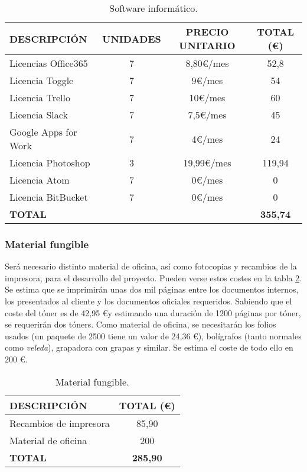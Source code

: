 \begin{table}[H]
\begin{center}
\begin{tabular}{l c c c}
\textbf{DESCRIPCIÓN} & \textbf{UNIDADES} & \textbf{PRECIO UNITARIO} & \textbf{TOTAL (\euro)}\\ \hline \hline
Licencias Office365 & 7 & 8,80\euro/mes & 52,8\\
Licencia Toggle & 7 & 9\euro/mes & 54\\
Licencia Trello & 7 & 10\euro/mes & 60\\
Licencia Slack & 7 & 7,5\euro/mes & 45\\
Google Apps for Work & 7 & 4\euro/mes & 24\\
Licencia Photoshop & 3 & 19,99\euro/mes & 119,94\\
Licencia Atom & 7 & 0\euro/mes & 0\\
Licencia BitBucket & 7 & 0\euro/mes & 0\\ \hline \hline
\textbf{TOTAL} & & & \textbf{355,74}\\ \hline
\end{tabular}
\caption{Software informático.}
\label{tab:software}
\end{center}
\end{table}



\subsubsection{Material fungible}
\par Será necesario distinto material de oficina, así como fotocopias y recambios de la impresora, para el desarrollo del proyecto. Pueden verse estos costes en la tabla \ref{tab:fungible}. Se estima que se imprimirán unas dos mil páginas entre los documentos internos, los presentados al cliente y los documentos oficiales requeridos. Sabiendo que el coste del tóner es de 42,95 \euro y estimando una duración de 1200 páginas por tóner, se requerirán dos tóners.
Como material de oficina, se necesitarán los folios usados (un paquete de 2500 tiene un valor de 24,36 \euro), bolígrafos (tanto normales como \textit{veleda}), grapadora con grapas y similar. Se estima el coste de todo ello en 200 \euro.


\begin{table}[H]
\begin{center}
\begin{tabular}{l c}
\textbf{DESCRIPCIÓN} & \textbf{TOTAL (\euro)}\\ \hline \hline
Recambios de impresora & 85,90\\
Material de oficina & 200\\ \hline \hline
\textbf{TOTAL} & \textbf{285,90}\\ \hline
\end{tabular}
\caption{Material fungible.}
\label{tab:fungible}
\end{center}
\end{table}


